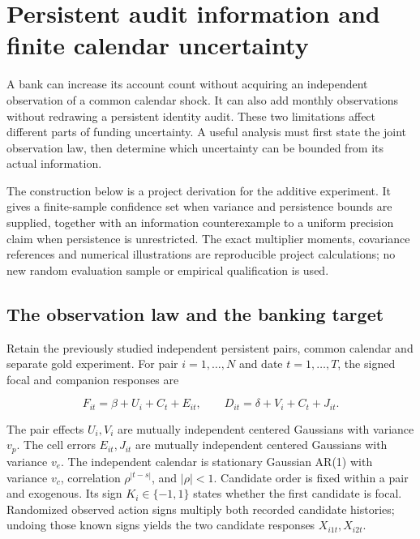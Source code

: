 \hypertarget{persistent-audit-information-and-finite-calendar-uncertainty}{%
\chapter{Persistent audit information and finite calendar
uncertainty}\label{persistent-audit-information-and-finite-calendar-uncertainty}}

\label{exec13:persistent-region}

A bank can increase its account count without acquiring an independent
observation of a common calendar shock. It can also add monthly
observations without redrawing a persistent identity audit. These two
limitations affect different parts of funding uncertainty. A useful
analysis must first state the joint observation law, then determine
which uncertainty can be bounded from its actual information.

The construction below is a project derivation for the additive
experiment. It gives a finite-sample confidence set when variance and
persistence bounds are supplied, together with an information
counterexample to a uniform precision claim when persistence is
unrestricted. The exact multiplier moments, covariance references and
numerical illustrations are reproducible project calculations; no new
random evaluation sample or empirical qualification is used.
\citep{exec13_persistent_derivation,exec13_persistent_examples}

\hypertarget{the-observation-law-and-the-banking-target}{%
\section{The observation law and the banking
target}\label{the-observation-law-and-the-banking-target}}

Retain the previously studied independent persistent pairs, common
calendar and separate gold experiment. For pair \(i=1,\ldots,N\) and
date \(t=1,\ldots,T\), the signed focal and companion responses are

\[
 F_{it}=\beta+U_i+C_t+E_{it},\qquad
 D_{it}=\delta+V_i+C_t+J_{it}.
\]

The pair effects \(U_i,V_i\) are mutually independent centered Gaussians
with variance \(v_p\). The cell errors \(E_{it},J_{it}\) are mutually
independent centered Gaussians with variance \(v_e\). The independent
calendar is stationary Gaussian AR(1) with variance \(v_c\), correlation
\(\rho^{|t-s|}\), and \(|\rho|<1\). Candidate order is fixed within a
pair and exogenous. Its sign \(K_i\in\{-1,1\}\) states whether the first
candidate is focal. Randomized observed action signs multiply both
recorded candidate histories; undoing those known signs yields the two
candidate responses \(X_{i1t},X_{i2t}\).


